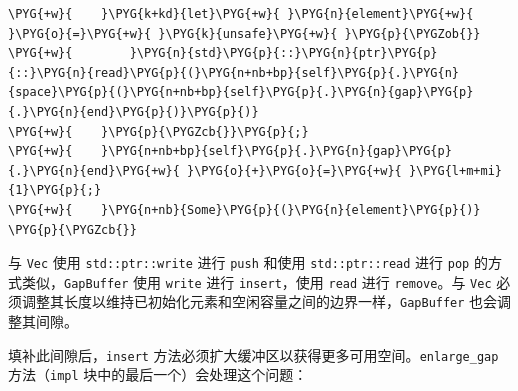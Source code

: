 \begin{Verbatim}[commandchars=\\\{\},breaklines=true,breakanywhere=true,fontsize=\codefont,xleftmargin=17bp]
\PYG{+w}{    }\PYG{k+kd}{let}\PYG{+w}{ }\PYG{n}{element}\PYG{+w}{ }\PYG{o}{=}\PYG{+w}{ }\PYG{k}{unsafe}\PYG{+w}{ }\PYG{p}{\PYGZob{}}
\PYG{+w}{        }\PYG{n}{std}\PYG{p}{::}\PYG{n}{ptr}\PYG{p}{::}\PYG{n}{read}\PYG{p}{(}\PYG{n+nb+bp}{self}\PYG{p}{.}\PYG{n}{space}\PYG{p}{(}\PYG{n+nb+bp}{self}\PYG{p}{.}\PYG{n}{gap}\PYG{p}{.}\PYG{n}{end}\PYG{p}{)}\PYG{p}{)}
\PYG{+w}{    }\PYG{p}{\PYGZcb{}}\PYG{p}{;}
\PYG{+w}{    }\PYG{n+nb+bp}{self}\PYG{p}{.}\PYG{n}{gap}\PYG{p}{.}\PYG{n}{end}\PYG{+w}{ }\PYG{o}{+}\PYG{o}{=}\PYG{+w}{ }\PYG{l+m+mi}{1}\PYG{p}{;}
\PYG{+w}{    }\PYG{n+nb}{Some}\PYG{p}{(}\PYG{n}{element}\PYG{p}{)}
\PYG{p}{\PYGZcb{}}
\end{Verbatim}

与 \texttt{Vec} 使用 \texttt{std::ptr::write} 进行 \texttt{push} 和使用 \texttt{std::ptr::read} 进行 \texttt{pop} 的方式类似，\texttt{GapBuffer} 使用 \texttt{write} 进行 \texttt{insert}，使用 \texttt{read} 进行 \texttt{remove}。与 \texttt{Vec} 必须调整其长度以维持已初始化元素和空闲容量之间的边界一样，\texttt{GapBuffer} 也会调整其间隙。

填补此间隙后，\texttt{insert} 方法必须扩大缓冲区以获得更多可用空间。\texttt{enlarge\_gap} 方法（\texttt{impl} 块中的最后一个）会处理这个问题：

